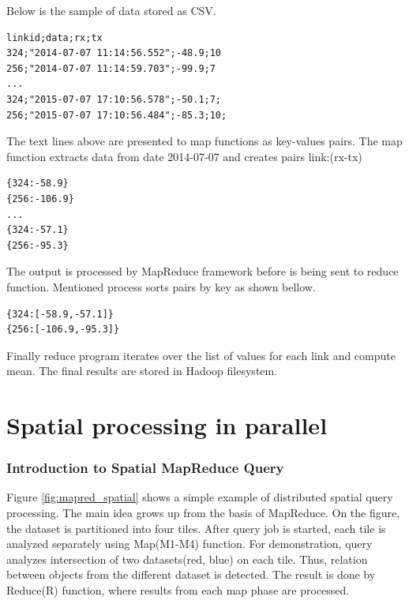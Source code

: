 \documentclass[a4paper,12pt,oneside]{report}
\begin{document}
	Below is the sample of data stored as CSV.
	\begin{footnotesize}
		\begin{lstlisting}[style=mybash]
linkid;data;rx;tx
324;"2014-07-07 11:14:56.552";-48.9;10
256;"2014-07-07 11:14:59.703";-99.9;7
...
324;"2015-07-07 17:10:56.578";-50.1;7;
256;"2015-07-07 17:10:56.484";-85.3;10;
		\end{lstlisting}
	\end{footnotesize}
	The text lines above are presented to map functions as key-values pairs.
	The map function extracts data from date 2014-07-07 and creates pairs
	{link:(rx-tx)}
	\begin{footnotesize}
		\begin{lstlisting}[style=mybash]
{324:-58.9}
{256:-106.9}
...
{324:-57.1}
{256:-95.3}
		\end{lstlisting}
	\end{footnotesize}
	The output is processed by MapReduce framework before is being sent to reduce
	function.
	Mentioned process sorts pairs by key as shown bellow.
	\begin{footnotesize}
		\begin{lstlisting}[style=mybash]
{324:[-58.9,-57.1]}
{256:[-106.9,-95.3]}
		\end{lstlisting}\end{footnotesize}
	Finally reduce program iterates over the list of values for each link and
	compute mean.
	The final results are stored in Hadoop filesystem.
	
	
	
	\section{Spatial processing in parallel}
	\subsubsection{Introduction to Spatial MapReduce Query}
	Figure \ref{fig:mapred_spatial} shows a simple example of distributed spatial
	query processing. The main idea 
	grows up from the basis of MapReduce. On the figure, the dataset is partitioned
	into four tiles. After 
	query job is started, each tile is analyzed separately using Map(M1-M4)
	function. For demonstration, 
	query analyzes intersection of two datasets(red, blue) on each tile. Thus,
	relation between 
	objects from the different dataset is detected. The result is done by Reduce(R)
	function, where results from each
	map phase are processed.
	
\end{document}
